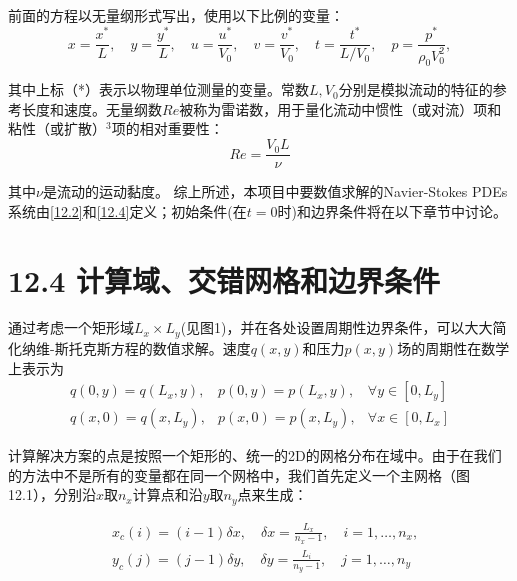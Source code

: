 \documentclass[UTF8]{ctexart}
\begin{document}
\indent 前面的方程以无量纲形式写出，使用以下比例的变量：
\begin{equation}
    x=\frac{x^*}{L}, \quad y=\frac{y^*}{L}, \quad u=\frac{u^*}{V_0}, \quad v=\frac{v^*}{V_0}, \quad t=\frac{t^*}{L / V_0}, \quad p=\frac{p^*}{\rho_0 V_0^2},
    \label{12.5}
\end{equation}

\indent 其中上标（*）表示以物理单位测量的变量。常数$L, V_0$分别是模拟流动的特征的参考长度和速度。无量纲数$R e$被称为雷诺数，用于量化流动中惯性（或对流）项和粘性（或扩散）${ }^3$项的相对重要性：
\begin{equation}
    R e=\frac{V_0 L}{\nu}
    \label{12.6}
\end{equation}

其中$\nu$是流动的运动黏度。
综上所述，本项目中要数值求解的Navier-Stokes PDEs系统由\ref{12.2}和\ref{12.4}定义；初始条件(在$t=0$时)和边界条件将在以下章节中讨论。

\section*{12.4 计算域、交错网格和边界条件}
通过考虑一个矩形域$L_x\times L_y$(见图1)，并在各处设置周期性边界条件，可以大大简化纳维-斯托克斯方程的数值求解。速度$q(x, y)$和压力$p(x, y)$场的周期性在数学上表示为
\begin{equation}
    \begin{array}{lll}
    q(0, y)=q\left(L_x, y\right), & p(0, y)=p\left(L_x, y\right), & \forall y \in\left[0, L_y\right]\\
    q(x, 0)=q\left(x, L_y\right), & p(x, 0)=p\left(x, L_y\right), & \forall x \in\left[0, L_x\right]
    \end{array}
    \label{12.7}
\end{equation}

\indent 计算解决方案的点是按照一个矩形的、统一的2D的网格分布在域中。由于在我们的方法中不是所有的变量都在同一个网格中，我们首先定义一个主网格（图12.1），分别沿$x$取$n_x$计算点和沿$y$取$n_y$点来生成：

\begin{equation}
    \begin{aligned}
    & x_c(i)=(i-1) \delta x, \quad \delta x=\frac{L_x}{n_x-1}, \quad i=1, \ldots, n_x, \\
    & y_c(j)=(j-1) \delta y, \quad \delta y=\frac{L_i}{n_y-1}, \quad j=1, \ldots, n_y
    \end{aligned}
    \label{12.8}
\end{equation}
\end{document}
